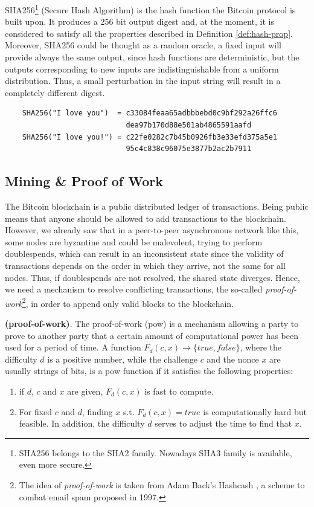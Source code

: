 \begin{myexample}
	SHA256\textup{\footnote{SHA256 belongs to the SHA2 family. Nowadays SHA3 family is available, even more secure.}} (Secure Hash Algorithm) is the hash function the Bitcoin protocol is built upon. It produces a 256 bit output digest and, at the moment, it is considered to satisfy all the properties described in Definition \ref{def:hash-prop}.
	Moreover, SHA256 could be thought as a random oracle, a fixed input will provide always the same output, since hash functions are deterministic, but the outputs corresponding to new inputs are indistinguishable from a uniform distribution. Thus, a small perturbation in the input string will result in a completely different digest.
	\begin{verbatim}
	SHA256("I love you")  = c33084feaa65adbbbebd0c9bf292a26ffc6
	                        dea97b170d88e501ab4865591aafd
	SHA256("I love you!") = c22fe0282c7b45b0926fb3e33efd375a5e1
	                        95c4c838c96075e3877b2ac2b7911
	\end{verbatim}
\end{myexample}

\subsection{Mining \& Proof of Work}
\label{sec:mining-pow}
The Bitcoin blockchain is a public distributed ledger of transactions. Being public means that anyone should be allowed to add transactions to the blockchain. However, we already saw that in a peer-to-peer asynchronous network like this, some nodes are byzantine and could be malevolent, trying to perform doublespends, which can result in an inconsistent state since the validity of transactions depends on the order in which they arrive, not the same for all nodes. Thus, if doublespends are not resolved, the shared state diverges. Hence, we need a mechanism to resolve conflicting transactions, the so-called \textit{proof-of-work}\footnote{The idea of \textit{proof-of-work} is taken from Adam Back's Hashcash \cite{Back02hashcash-}, a scheme to combat email spam proposed in 1997.}, in order to append only valid blocks to the blockchain.

\begin{mydef}{\bf (proof-of-work)}.
    \label{def:pow}
    The proof-of-work (pow) is a mechanism allowing a party to prove to another party that a certain amount of computational power has been used for a period of time. A function $F_{d}(c,x) \rightarrow \{true,false\}$, where the difficulty $d$ is a positive number, while the challenge $c$ and the nonce $x$ are usually strings of bits, is a pow function if it satisfies the following properties:
    \begin{enumerate}
        \item if $d$, $c$ and $x$ are given, $F_{d}(c,x)$ is fast to compute.
        \item For fixed $c$ and $d$, finding $x$ s.t. $F_{d}(c,x) = true$ is computationally hard but feasible. In addition, the difficulty $d$ serves to adjust the time to find that $x$.
    \end{enumerate}
\end{mydef}

